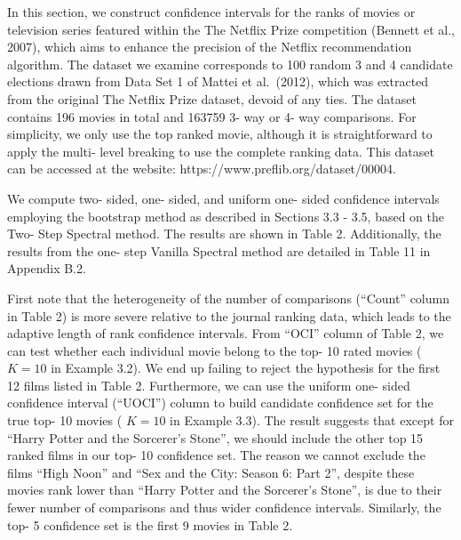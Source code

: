 In this section, we construct confidence intervals for the ranks of
movies or television series featured within the The Netflix Prize
competition (Bennett et al., 2007), which aims to enhance the precision
of the Netflix recommendation algorithm. The dataset we examine
corresponds to 100 random 3 and 4 candidate elections drawn from Data
Set 1 of Mattei et al.~(2012), which was extracted from the original The
Netflix Prize dataset, devoid of any ties. The dataset contains 196
movies in total and 163759 3- way or 4- way comparisons. For simplicity,
we only use the top ranked movie, although it is straightforward to
apply the multi- level breaking to use the complete ranking data. This
dataset can be accessed at the website:
https://www.preflib.org/dataset/00004.

We compute two- sided, one- sided, and uniform one- sided confidence
intervals employing the bootstrap method as described in Sections 3.3 -
3.5, based on the Two- Step Spectral method. The results are shown in
Table 2. Additionally, the results from the one- step Vanilla Spectral
method are detailed in Table 11 in Appendix B.2.

First note that the heterogeneity of the number of comparisons
(``Count'' column in Table 2) is more severe relative to the journal
ranking data, which leads to the adaptive length of rank confidence
intervals. From ``OCI'' column of Table 2, we can test whether each
individual movie belong to the top- 10 rated movies ( \(K = 10\) in
Example 3.2). We end up failing to reject the hypothesis for the first
12 films listed in Table 2. Furthermore, we can use the uniform one-
sided confidence interval (``UOCI'') column to build candidate
confidence set for the true top- 10 movies ( \(K = 10\) in Example 3.3).
The result suggests that except for ``Harry Potter and the Sorcerer's
Stone'', we should include the other top 15 ranked films in our top- 10
confidence set. The reason we cannot exclude the films ``High Noon'' and
``Sex and the City: Season 6: Part 2'', despite these movies rank lower
than ``Harry Potter and the Sorcerer's Stone'', is due to their fewer
number of comparisons and thus wider confidence intervals. Similarly,
the top- 5 confidence set is the first 9 movies in Table 2.

